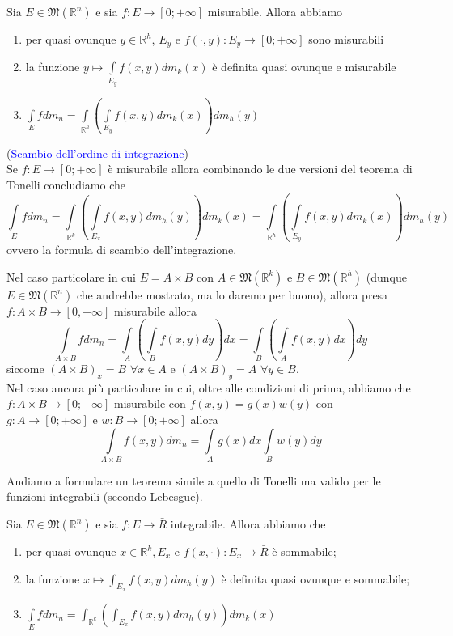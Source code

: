 \begin{theorem}[\textcolor{blue}{di Tonelli "invertito"}]
	Sia $E \in \mathfrak{M}(\mathbb{R}^n)$ e sia $f: E \to [0; +\infty]$ misurabile. Allora abbiamo
	\begin{enumerate}[label=\protect\circled{\arabic*}]
		\item per quasi ovunque $y \in \mathbb{R}^h$, $E_y$ e $f(\cdot, y): E_y \to [0; +\infty]$ sono misurabili
		\item la funzione $y \mapsto \int\limits_{E_y} f(x, y)dm_k(x)$ è definita quasi ovunque e misurabile
		\item $\int\limits_E f dm_n = \int\limits_{\mathbb{R}^h} (\int\limits_{E_y} f(x, y) dm_k(x)) dm_h(y)$
	\end{enumerate}
\end{theorem}
%
\begin{remark}(\textcolor{blue}{Scambio dell'ordine di integrazione}) \\
Se $f: E \to [0; +\infty]$ è misurabile allora combinando le due versioni del teorema di Tonelli concludiamo che
$$
	\int\limits_E fdm_n = \int\limits_{\mathbb{R}^k} \left( \int\limits_{E_x} f(x,y)dm_h(y) \right)dm_k(x) = \int\limits_{\mathbb{R}^h} \left( \int\limits_{E_y} f(x, y)dm_k(x) \right) dm_h(y)
$$
ovvero la formula di scambio dell'integrazione. 

Nel caso particolare in cui $E = A \times B$ con $A \in \mathfrak{M}(\mathbb{R}^k)$ e $B \in \mathfrak{M}(\mathbb{R}^h)$ (dunque $E \in \mathfrak{M}(\mathbb{R}^n)$ che andrebbe mostrato, ma lo daremo per buono), allora presa $f: A \times B \to [0, +\infty]$ misurabile allora
$$\int\limits_{A \times B} fdm_n = \int\limits_A \left(\int\limits_B f(x, y)dy\right)dx = \int\limits_B \left(\int\limits_A f(x, y)dx\right)dy$$ 
siccome $(A \times B)_x = B \, \, \forall x \in A$ e $(A \times B)_y = A \, \, \forall y \in B$. \\
Nel caso ancora più particolare in cui, oltre alle condizioni di prima, abbiamo che $f: A \times B \to [0; +\infty]$ misurabile con $f(x, y) = g(x)w(y)$ con $g: A \to [0; +\infty]$ e $w: B \to [0;+\infty]$ allora
$$
\int\limits_{A \times B} f(x,y)dm_n = \int\limits_A g(x)dx \int\limits_B w(y)dy
$$
\end{remark}
%
Andiamo a formulare un teorema simile a quello di Tonelli ma valido per le funzioni integrabili (secondo Lebesgue).
%
\vspace{0.5cm}
\begin{theorem}[\textcolor{blue}{di Fubini}]
	Sia $E \in \mathfrak{M}(\mathbb{R}^n)$ e sia $f: E \to \bar{R}$ integrabile. Allora abbiamo che
	\begin{enumerate}[label=\protect\circled{\arabic*}]
		\item per quasi ovunque $x \in \mathbb{R}^k, E_x$ e $f(x, \cdot): E_x \to \bar{R}$ è sommabile;
		\item la funzione $x \mapsto \int_{E_x} f(x, y)dm_h(y)$ è definita quasi ovunque e sommabile;
		\item $\int\limits_E fdm_n = \int_{\mathbb{R}^k} \left( \int_{E_x} f(x, y)dm_h(y) \right) dm_k(x)$ 
	\end{enumerate}
\end{theorem}
